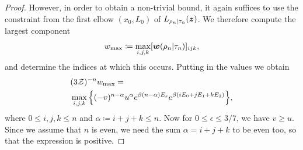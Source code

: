 \documentclass[pra,
aps,
twocolumn,
superscriptaddress,
groupedaddress,
nofootinbib,
reprint
]{revtex4-1}
\begin{document}
\begin{proof}
However, in order to obtain a non-trivial bound, it again suffices to use the constraint from the first elbow $(x_0, L_0)$ of $L_{\rho_n|\tau_n}(\bm{z})$. We therefore compute the largest component 
\begin{equation}
	w_{\rm max} \coloneqq \max_{i,j,k} [\boldsymbol{w}(\rho_n | \tau_n)]_{ijk},
\end{equation}
and determine the indices at which this occurs.
Putting in the values we obtain
\begin{align}
	&(3\mathcal{Z})^{-n}w_{\rm max} = \nonumber\\
	&\max\limits_{i,j,k}\Big\{ (-v)^{n-\alpha} u^{\alpha} e^{\beta (n-\alpha)E_s} e^{\beta ( i E_0 + j E_1 + k E_2 )} \Big\}, \label{eq:max_slope}
\end{align}
where $0 \leq i,j,k \leq n$ and $\alpha \coloneqq i+j+k \leq n$.
Now for $0 \leq \epsilon \leq 3/7$, we have $v \geq u$. Since we assume that $n$ is even, we need the sum $\alpha = i+j+k$ to be even too, so that the expression is positive. 


\end{proof}
\end{document}
